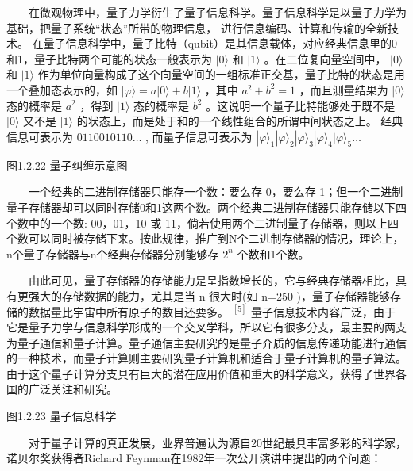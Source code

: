 \documentclass[a4paper,11pt,english]{sphinxmanual}
\begin{document}
\sphinxAtStartPar
  在微观物理中，量子力学衍生了量子信息科学。量子信息科学是以量子力学为基础，把量子系统“状态”所带的物理信息， 进行信息编码、计算和传输的全新技术。 在量子信息科学中，量子比特（qubit）是其信息载体，对应经典信息里的0和1，量子比特两个可能的状态一般表示为 \(|0\rangle\) 和 \(|1\rangle\)  。在二位复向量空间中， \(|0\rangle\) 和  \(|1\rangle\) 作为单位向量构成了这个向量空间的一组标准正交基，量子比特的状态是用一个叠加态表示的，如 \(| \varphi\rangle = a |0 \rangle + b|1 \rangle\) ，其中 \(a^{2}+b^{2}=1\) ，而且测量结果为 \(|0 \rangle\) 态的概率是 \(a^{2}\) ，得到 \(|1 \rangle\) 态的概率是  \(b^{2}\)  。这说明一个量子比特能够处于既不是 \(|0 \rangle\) 又不是 \(|1 \rangle\) 的状态上，而是处于和的一个线性组合的所谓中间状态之上。 经典信息可表示为 \(0110010110 \ldots\) , 而量子信息可表示为 \(|\varphi\rangle_{1}|\varphi\rangle_{2}|\varphi\rangle_{3}|\varphi\rangle_{4}|\varphi\rangle_{5} \ldots\)


\begin{center}图1.2.22 量子纠缠示意图
\end{center}
\sphinxAtStartPar
  一个经典的二进制存储器只能存一个数：要么存 0，要么存 1；但一个二进制量子存储器却可以同时存储0和1这两个数。两个经典二进制存储器只能存储以下四个数中的一个数: 00，01，10 或 11，倘若使用两个二进制量子存储器，则以上四个数可以同时被存储下来。按此规律，推广到N个二进制存储器的情况，理论上，n个量子存储器与n个经典存储器分别能够存 \(2^n\) 个数和1个数。

\sphinxAtStartPar
  由此可见，量子存储器的存储能力是呈指数增长的，它与经典存储器相比，具有更强大的存储数据的能力，尤其是当 n 很大时(如 n=250 )，量子存储器能够存储的数据量比宇宙中所有原子的数目还要多。 \(^{[5]}\) 量子信息技术内容广泛，由于它是量子力学与信息科学形成的一个交叉学科，所以它有很多分支，最主要的两支为量子通信和量子计算。量子通信主要研究的是量子介质的信息传递功能进行通信的一种技术，而量子计算则主要研究量子计算机和适合于量子计算机的量子算法。由于这个量子计算分支具有巨大的潜在应用价值和重大的科学意义，获得了世界各国的广泛关注和研究。


\begin{center}图1.2.23 量子信息科学
\end{center}
\sphinxAtStartPar
  对于量子计算的真正发展，业界普遍认为源自20世纪最具丰富多彩的科学家，诺贝尔奖获得者Richard Feynman在1982年一次公开演讲中提出的两个问题：
\end{document}
